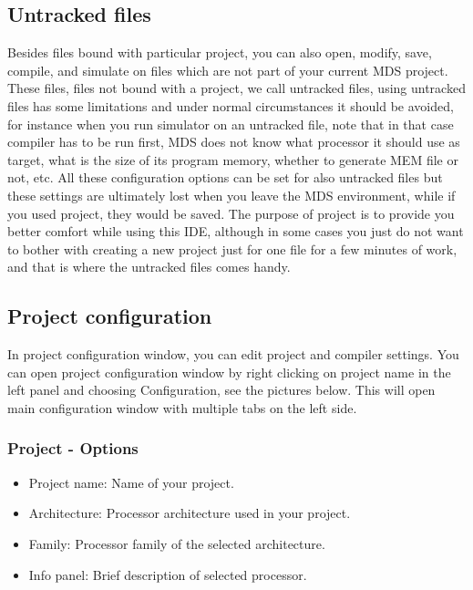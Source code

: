     \subsection{Untracked files}
        Besides files bound with particular project, you can also open, modify, save, compile, and simulate on files which are not part of your current MDS project. These files, files not bound with a project, we call untracked files, using untracked files has some limitations and under normal circumstances it should be avoided, for instance when you run simulator on an untracked file, note that in that case compiler has to be run first, MDS does not know what processor it should use as target, what is the size of its program memory, whether to generate MEM file or not, etc. All these configuration options can be set for also untracked files but these settings are ultimately lost when you leave the MDS environment, while if you used project, they would be saved. The purpose of project is to provide you better comfort while using this IDE, although in some cases you just do not want to bother with creating a new project just for one file for a few minutes of work, and that is where the untracked files comes handy.

    \clearpage
    \subsection{Project configuration}
        In project configuration window, you can edit project and compiler settings. You can open project configuration
        window by right clicking on project name in the left panel and choosing Configuration, see the pictures below.
        This will open main configuration window with multiple tabs on the left side.

        \subsubsection{Project - Options}
            \begin{itemize}
                \item Project name: Name of your project.
                \item Architecture: Processor architecture used in your project.
                \item Family: Processor family of the selected architecture.
                \item Info panel: Brief description of selected processor.
            \end{itemize}

